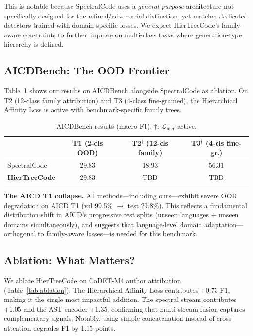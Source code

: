 \documentclass{article}
\begin{document}
This is notable because SpectralCode uses a \emph{general-purpose} architecture not specifically designed for the refined/adversarial distinction, yet matches dedicated detectors trained with domain-specific losses. We expect HierTreeCode's family-aware constraints to further improve on multi-class tasks where generation-type hierarchy is defined.


\subsection{AICDBench: The OOD Frontier}

Table~\ref{tab:aicd_results} shows our results on AICDBench alongside SpectralCode as ablation. On T2 (12-class family attribution) and T3 (4-class fine-grained), the Hierarchical Affinity Loss is active with benchmark-specific family trees.

\begin{table}[t]
\caption{AICDBench results (macro-F1). $\dagger$: $\mathcal{L}_{\text{hier}}$ active.}
\label{tab:aicd_results}
\centering
\small
\begin{tabular}{lccc}
\toprule
& \textbf{T1} {\scriptsize (2-cls OOD)} & \textbf{T2}$^\dagger$ {\scriptsize (12-cls family)} & \textbf{T3}$^\dagger$ {\scriptsize (4-cls fine-gr.)} \\
\midrule
SpectralCode & 29.83 & 18.93 & 56.31 \\
\rowcolor{ours}
\textbf{HierTreeCode} & 29.83 & TBD & TBD \\
\bottomrule
\end{tabular}
\end{table}

\textbf{The AICD T1 collapse.} All methods---including ours---exhibit severe OOD degradation on AICD T1 (val 99.5\% $\to$ test 29.8\%). This reflects a fundamental distribution shift in AICD's progressive test splits (unseen languages + unseen domains simultaneously), and suggests that language-level domain adaptation---orthogonal to family-aware losses---is needed for this benchmark.


\subsection{Ablation: What Matters?}

We ablate HierTreeCode on CoDET-M4 author attribution (Table~\ref{tab:ablation}). The Hierarchical Affinity Loss contributes +0.73 F1, making it the single most impactful addition. The spectral stream contributes +1.05 and the AST encoder +1.35, confirming that multi-stream fusion captures complementary signals. Notably, using simple concatenation instead of cross-attention degrades F1 by 1.15 points.
\end{document}
